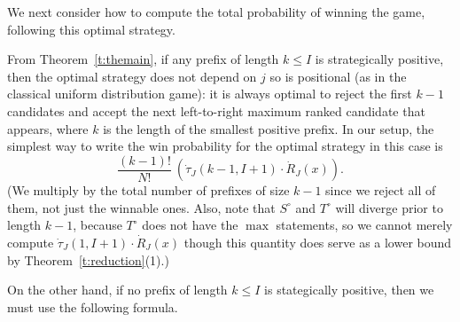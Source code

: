 \documentclass[11pt]{amsart}   %
\theoremstyle{definition}
\theoremstyle{remark}
\numberwithin{equation}{section}
\theoremstyle{theorem}
\begin{document}
We next consider how to compute the total probability of winning the game, following this optimal strategy. 

From Theorem~\ref{t:themain}, if any prefix of length $k \leq I$ is
strategically positive, then the optimal strategy does not depend on $j$ so is positional (as in the
classical uniform distribution game): it is always optimal to reject the first $k-1$
candidates and accept the next left-to-right maximum ranked candidate that
appears, where $k$ is the length of the smallest positive prefix.
In our setup, the simplest way to write the win probability for the optimal strategy in this case is 
\begin{equation}\label{e:mainprob_t}
 \frac{(k-1)!}{N!} \ \left( \dot\tau_J(k-1, I+1) \cdot \dot{R}_J(x) \right). 
\end{equation}
(We multiply by the total number of prefixes of size $k-1$ since we reject all of them, not just the winnable ones.  Also, note that $S^\circ$ and $T^\circ$ will diverge prior to length $k-1$, because $T^\circ$ does not have the $\max$ statements, so we cannot merely compute $\dot\tau_J(1, I+1) \cdot \dot{R}_J(x)$ though this quantity does serve as a lower bound by Theorem~\ref{t:reduction}(1).)

On the other hand, if no prefix of length $k \leq I$ is stategically positive, then we must use the following formula.
\end{document}
